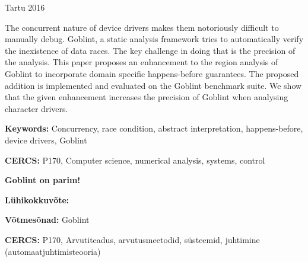 \documentclass{style/master-thesis}
\begin{document}
\vfill
\centerline{Tartu 2016}



\pagebreak

\noindent\textbf{\large \articleName}
\vspace*{3ex}
{ The concurrent nature of device drivers makes them notoriously difficult to manually debug.
Goblint, a static analysis framework tries to automatically verify the inexistence of data races. 
The key challenge in doing that is the precision of the analysis.
This paper proposes an enhancement to the region analysis of Goblint to incorporate domain specific happens-before guarantees. 
The proposed addition is implemented and evaluated on the Goblint benchmark suite.
We show that the given enhancement increases the precision of Goblint when analysing character drivers.
}

\vspace*{3ex}
\begin{flushleft}
  \textbf{Keywords:} Concurrency, race condition, abstract interpretation, happens-before, device drivers, Goblint
\end{flushleft}
\vspace*{3ex}

\noindent\textbf{CERCS:} P170, Computer science, numerical analysis, systems, control

\vspace*{6ex}
\noindent\textbf{Goblint on parim!}
\vspace*{3ex}


\noindent\textbf{Lühikokkuvõte:} 
\vspace*{3ex}

\begin{flushleft}
  \textbf{Võtmesõnad:} Goblint
\end{flushleft}
\vspace*{3ex}

\noindent\textbf{CERCS:} P170, Arvutiteadus, arvutusmeetodid, süsteemid, juhtimine (automaatjuhtimisteooria)

\newpage

\end{document}
